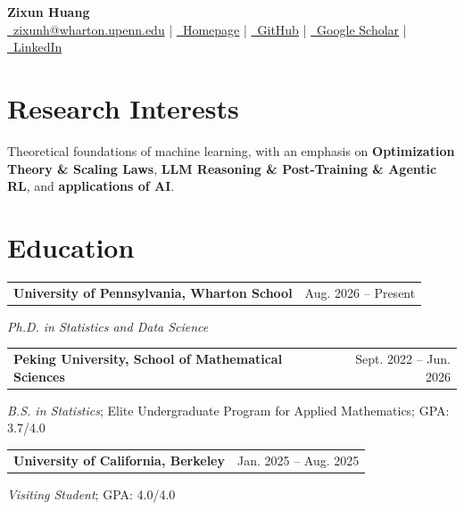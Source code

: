 \documentclass[a4paper,9pt]{extarticle}
\makeatletter
\newcommand{\datedentry}[2]{%
\begin{tabularx}{\linewidth}{@{}X r@{}}
#1 & #2
\end{tabularx}}
\makeatother
\begin{document}
\begin{center}
    {\LARGE \textbf{Zixun Huang}}\\[3pt]
    {\small
    \href{mailto:zixunh@wharton.upenn.edu}{\faEnvelope\ zixunh@wharton.upenn.edu} \; | \;
    \href{https://alexhuang13.github.io/}{\faGlobe\ Homepage} \; | \;
    \href{https://github.com/alexhuang13}{\faGithub\ GitHub} \; | \;
    \href{https://scholar.google.com/citations?user=n7NzBzAAAAAJ}{\faGraduationCap\ Google Scholar} \; | \;
    \href{https://www.linkedin.com/in/zixun-huang-b80ab4351/}{\faLinkedin\ LinkedIn}}
\end{center}
\vspace{-9pt}

\section{Research Interests}
Theoretical foundations of machine learning, with an emphasis on \textbf{Optimization Theory \& Scaling Laws}, \textbf{LLM Reasoning \& Post-Training \& Agentic RL}, and \textbf{applications of AI}.

\section{Education}
\datedentry{\textbf{University of Pennsylvania, Wharton School}}{Aug. 2026 -- Present}
\vspace{-2pt}
\hspace{1em}\textit{Ph.D. in Statistics and Data Science}

\datedentry{\textbf{Peking University, School of Mathematical Sciences}}{Sept. 2022 -- Jun. 2026}
\vspace{-2pt}
\hspace{1em}\textit{B.S. in Statistics}; Elite Undergraduate Program for Applied Mathematics; GPA: 3.7/4.0

\datedentry{\textbf{University of California, Berkeley}}{Jan. 2025 -- Aug. 2025}
\vspace{-2pt}
\hspace{1em}\textit{Visiting Student}; GPA: 4.0/4.0

\end{document}
